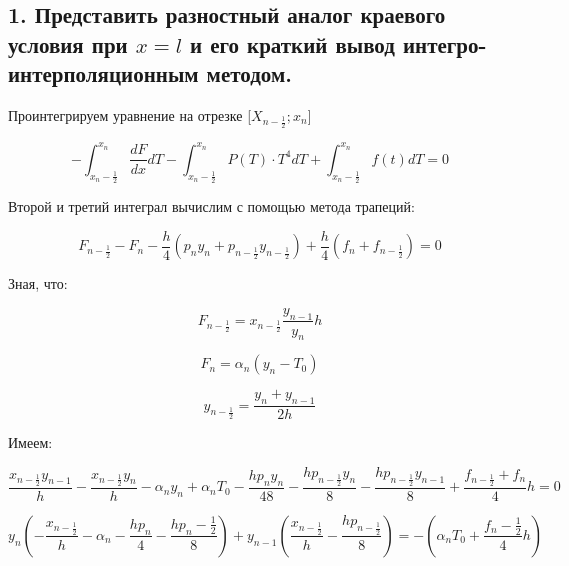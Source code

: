 \documentclass[a4paper,oneside,12pt]{extreport}
\begin{document}
\subsection{1. Представить разностный аналог краевого условия при $x = l$ и его краткий вывод интегро-интерполяционным методом.}

Проинтегрируем уравнение на отрезке [$X_{n - \frac{1}{2}}; x_{n}$]

\begin{equation*}
	- \int^{x_{n}}_{x_n - \frac{1}{2}} \frac{dF}{dx} dT - \int^{x_n}_{x_n - \frac{1}{2}} P(T) \cdot T^4 dT + \int^{x_{n}}_{x_{n} - \frac{1}{2}} f(t) dT = 0
\end{equation*}

Второй и третий интеграл вычислим с помощью метода трапеций:

\begin{equation*}
	F_{n - \frac{1}{2}} - F_{n} - \frac{h}{4} (p_{n} y_{n} + p_{n - \frac{1}{2}}y_{n-\frac{1}{2}}) + \frac{h}{4} (f_{n} + f_{n - \frac{1}{2}}) = 0
\end{equation*}

Зная, что: 

\begin{equation*}
	F_{n - \frac{1}{2}} = x_{n - \frac{1}{2}} \frac{y_{n - 1}}{y_n}{h}
\end{equation*}

\begin{equation*}
	F_{n} = \alpha_{n}(y_{n} - T_{0})
\end{equation*}

\begin{equation*}
	y_{n - \frac{1}{2}} = \frac{y_{n} + y_{n - 1}}{2h}
\end{equation*}

Имеем:

\begin{equation*}
	\frac{x_{n - \frac{1}{2}} y_{n - 1}}{h} - \frac{x_{n - \frac{1}{2}}y_{n}}{h} - \alpha_{n}y_{n} + \alpha_{n} T_{0} - \frac{hp_{n}y_{n}}{48} - \frac{hp_{n - \frac{1}{2}}y_{n}}{8} - \frac{hp_{n - \frac{1}{2}}y_{n - 1}}{8} + \frac{f_{n - \frac{1}{2}} + f_{n}}{4}h = 0
\end{equation*}

\begin{equation*}
	y_{n}(-\frac{x_{n - \frac{1}{2}}}{h} - \alpha_{n} - \frac{hp_{n}}{4} - \frac{hp_{n} - \frac{1}{2}}{8}) + y_{n - 1}(\frac{x_{n - \frac{1}{2}}}{h} - \frac{hp_{n - \frac{1}{2}}}{8}) = -(\alpha_{n}T_{0} + \frac{f_{n} - \frac{1}{2}}{4}h)
\end{equation*}
\end{document}
